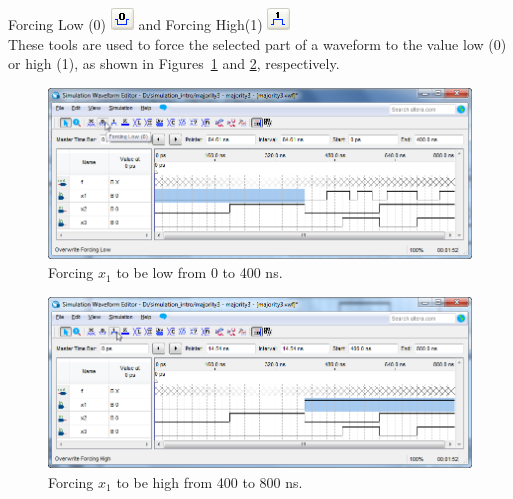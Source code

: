 \documentclass[11pt, twoside, pdftex]{article}
\begin{document}
\begin{description}
	\item {\sf Forcing Low (0)} \hbox{\includegraphics[scale=0.7]{figures/appendix/icon4.png}} {\sf and Forcing High(1)} \hbox{\includegraphics[scale=0.7]{figures/appendix/icon5.png}}\\
	These tools are used to force the selected part of a waveform to the value low (0) or high (1), as shown in Figures~\ref{fig:fig4} 
	and \ref{fig:fig5}, respectively. 
	\begin{figure}[H]
	   \begin{center}
	      \includegraphics[scale=0.65]{figures/appendix/figure4.png}
	   \caption{Forcing $x_1$ to be low from 0 to 400 ns.} 
		 \label{fig:fig4}
		 \end{center}
	\end{figure}	
	
	\begin{figure}[H]
	   \begin{center}
	      \includegraphics[scale=0.65]{figures/appendix/figure5.png}
	   \caption{Forcing $x_1$ to be high from 400 to 800 ns.} 
		 \label{fig:fig5}
		 \end{center}
	\end{figure}	
	

\end{description}
\end{document}
